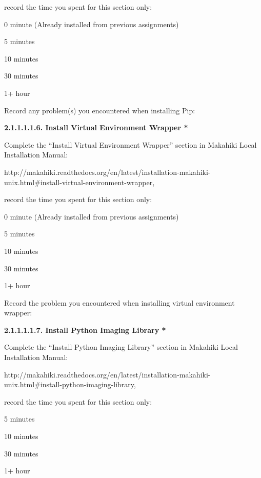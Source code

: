 record the time you spent for this section only:

\begin{radiobutton}
\item 0 minute (Already installed from previous assignments)
\item 5 minutes
\item  10 minutes
\item  30 minutes
\item  1+ hour
\end{radiobutton}

Record any problem(s) you encountered when installing Pip: \underline{\hspace{4cm}}

{\bf 2.1.1.1.1.6. Install Virtual Environment Wrapper *}

Complete the ``Install Virtual Environment Wrapper'' section in Makahiki Local Installation Manual:

http://makahiki.readthedocs.org/en/latest/installation-makahiki-unix.html\#install-virtual-environment-wrapper, 

record the time you spent for this section only:

\begin{radiobutton}
\item 0 minute (Already installed from previous assignments)
\item 5 minutes
\item  10 minutes
\item  30 minutes
\item  1+ hour
\end{radiobutton}

Record the problem you encountered when installing virtual environment wrapper: \underline{\hspace{3cm}}

{\bf 2.1.1.1.1.7. Install Python Imaging Library *}

Complete the ``Install Python Imaging Library'' section in Makahiki Local Installation Manual:

http://makahiki.readthedocs.org/en/latest/installation-makahiki-unix.html\#install-python-imaging-library, 

record the time you spent for this section only:

\begin{radiobutton}
\item 5 minutes
\item  10 minutes
\item  30 minutes
\item  1+ hour
\end{radiobutton}

